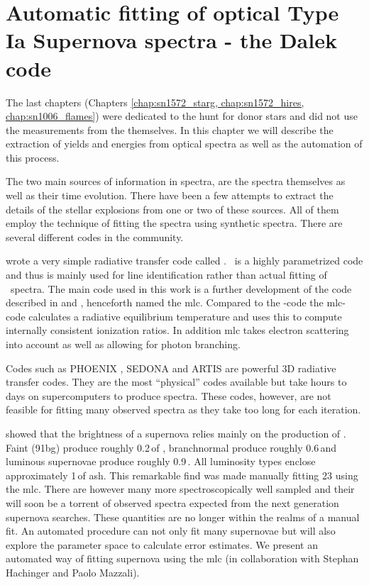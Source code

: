 \chapter{Automatic fitting of optical Type Ia Supernova spectra - the Dalek code}
\label{chap:dalek}

The last chapters (Chapters \ref{chap:sn1572_starg, chap:sn1572_hires, chap:sn1006_flames}) were dedicated to the hunt for donor stars and did not use the measurements from the \sneia themselves. In this chapter we will describe the extraction of yields and energies from optical spectra as well as the automation of this process.

The two main sources of information in spectra, are the spectra themselves as well as their time evolution. There have been a few attempts to extract the details of the stellar explosions from one or two of these sources. All of them employ the technique of fitting the spectra using synthetic spectra.  There are several different codes in the community. 


\cite{2000PhDT.........6F} wrote a very simple radiative transfer code called \synow. \synow\ is a highly parametrized code and thus is mainly used for line identification rather than actual fitting of \snia\ spectra. 
The main code used in this work is a further development of the code described in \citet{1993A&A...279..447M}  and \citet{2000A&A...363..705M}, henceforth named the \gls{mlc}. Compared to the \synow-code the \gls{mlc}-code calculates a radiative equilibrium temperature and uses this to compute internally consistent ionization ratios. In addition \gls{mlc} takes electron scattering into account as well as allowing for photon branching. 

Codes such as PHOENIX \cite{1999JCoAM.109...41H}, SEDONA \cite{2006ApJ...651..366K} and ARTIS \cite{2009MNRAS.398.1809K} are powerful 3D radiative transfer codes. They are the most ``physical'' codes available but take hours to days on supercomputers to produce spectra. These codes, however, are not feasible for fitting many observed spectra as they take too long for each iteration. 

 \cite{2007Sci...315..825M} showed that the brightness of a supernova relies mainly on the production of \Ni. Faint \sneia (\gls{91bg}) produce roughly 0.2\,\msun of \Ni, \gls{branchnormal} \snia produce roughly 0.6\,\msun and luminous supernovae produce roughly 0.9\,\msun. All luminosity types enclose approximately 1\,\msun of ash. This remarkable find was made manually fitting 23 \sneia using the \gls{mlc}. There are however many more spectroscopically well sampled \sneia and their will soon be a torrent of observed spectra expected from the next generation supernova searches. These quantities are no longer within the realms of a manual fit. An automated procedure can not only fit many supernovae but will also explore the parameter space to calculate error estimates. We present an automated way of fitting supernova using the  \gls{mlc} (in collaboration with Stephan Hachinger and Paolo Mazzali).

